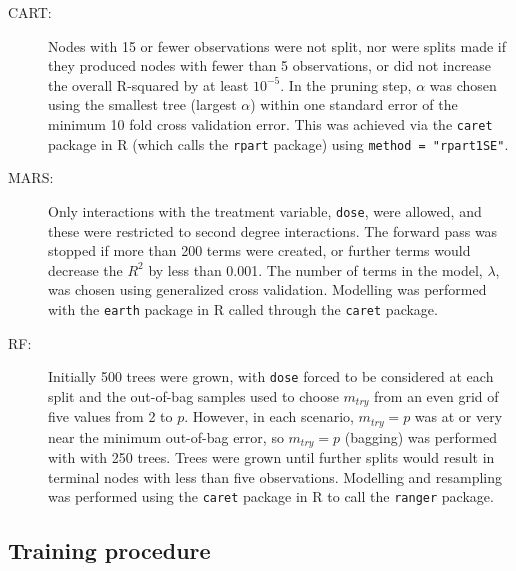 \documentclass[12pt]{article}
\begin{document}
\begin{description}
  \item [CART:] Nodes with 15 or fewer observations were not split, nor were splits made if they produced nodes with fewer than 5 observations, or did not increase the overall R-squared by at least $10^{-5}$.
  In the pruning step, $\alpha$ was chosen using the smallest tree (largest $\alpha$) within one standard error of the minimum 10 fold cross validation error. This was achieved via the \texttt{caret} package in \textsf{R} (which calls the \texttt{rpart} package) using \texttt{method = "rpart1SE"}.
  \item [MARS:] Only interactions with the treatment variable, \texttt{dose}, were allowed, and these were restricted to second degree interactions. The forward pass was stopped if more than 200 terms were created, or further terms would decrease the $R^2$ by less than 0.001. The number of terms in the model, $\lambda$, was chosen using generalized cross validation. Modelling was performed with the \texttt{earth} package in \textsf{R} called through the \texttt{caret} package.
  \item [RF:] Initially 500 trees were grown, with \texttt{dose} forced to be considered at each split and the out-of-bag samples used to choose $m_{try}$ from an even grid of five values from 2 to $p$. However, in each scenario, $m_{try} = p$ was at or very near the minimum out-of-bag error, so $m_{try} = p$ (bagging) was performed with with 250 trees. Trees were grown until further splits would result in terminal nodes with less than five observations. Modelling and resampling was performed using the \texttt{caret} package in \textsf{R} to call the \texttt{ranger} package.
\end{description}



\subsection{Training procedure} %
\label{sub:procedure}
\end{document}
